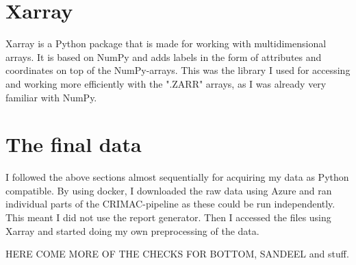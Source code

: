         
        
    \section{Xarray}
        Xarray\cite{xarray} is a Python package that is made for working with multidimensional arrays. It is based on NumPy and adds labels in the form of attributes and coordinates on top of the NumPy-arrays. This was the library I used for accessing and working more efficiently with the ".ZARR" arrays, as I was already very familiar with NumPy.
        
        
    \section{The final data}
        I followed the above sections almost sequentially for acquiring my data as Python compatible. By using docker, I downloaded the raw data using Azure and ran individual parts of the CRIMAC-pipeline as these could be run independently. This meant I did not use the report generator. Then I accessed the files using Xarray and started doing my own preprocessing of the data.
        
        HERE COME MORE OF THE CHECKS FOR BOTTOM, SANDEEL and stuff.
        

        

        